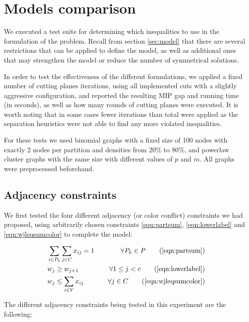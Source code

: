 
\section{Models comparison}

We executed a test suite for determining which inequalities to use in the formulation of the problem. Recall from section \ref{sec:model} that there are several restrictions that can be applied to define the model, as well as additional ones that may strengthen the model or reduce the number of symmetrical solutions.

In order to test the effectiveness of the different formulations, we applied a fixed number of cutting planes iterations, using all implemented cuts with a slightly aggressive configuration, and reported the resulting MIP gap and running time (in seconds), as well as how many rounds of cutting planes were executed. It is worth noting that in some cases fewer iterations than total were applied as the separation heuristics were not able to find any more violated inequalities.

For these tests we used binomial graphs with a fixed size of 100 nodes with exactly 2 nodes per partition and densities from $20\%$ to $80\%$, and powerlaw cluster graphs with the same size with different values of $p$ and $m$. All graphs were preprocessed beforehand.

\subsection{Adjacency constraints}

We first tested the four different adjacency (or color conflict) constraints we had proposed, using arbitrarily chosen constraints \ref{eqn:partsum}, \ref{eqn:lowerlabel} and \ref{eqn:wjleqsumcolor} to complete the model:

\begin{align*}
&\sum_{i \in P_k} \sum_{j \in C} x_{ij} = 1 &\quad \forall P_k \in P \tag{\ref{eqn:partsum}} \\
&w_j \geq w_{j+1} &\quad \forall 1 \leq j < c \tag{\ref{eqn:lowerlabel}} \\
&w_j \leq \sum_{i \in V} x_{ij} &\quad \forall j \in C \tag{\ref{eqn:wjleqsumcolor}} \\
\end{align*}

The different adjacency constraints being tested in this experiment are the following: 

